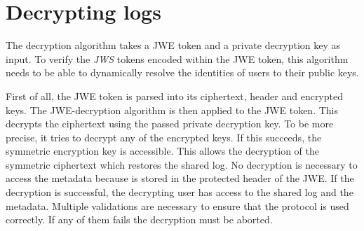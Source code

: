\documentclass[../main.tex]{subfiles}
\begin{document}
\section{Decrypting logs}\label{sec:decrypting}

The decryption algorithm takes a JWE token and a private decryption key as input.
To verify the \textit{JWS} tokens encoded within the JWE token, this algorithm needs to be able to dynamically resolve the identities of users to their public keys.

First of all, the JWE token is parsed into its ciphertext, header and encrypted keys.
The JWE-decryption algorithm is then applied to the JWE token.
This decrypts the ciphertext using the passed private decryption key.
To be more precise, it tries to decrypt any of the encrypted keys.
If this succeeds, the symmetric encryption key is accessible.
This allows the decryption of the symmetric ciphertext which restores the shared log.
No decryption is necessary to access the metadata because is stored in the protected header of the JWE.
If the decryption is successful, the decrypting user has access to the shared log and the metadata.
Multiple validations are necessary to ensure that the protocol is used correctly.
If any of them fails the decryption must be aborted.
\end{document}

